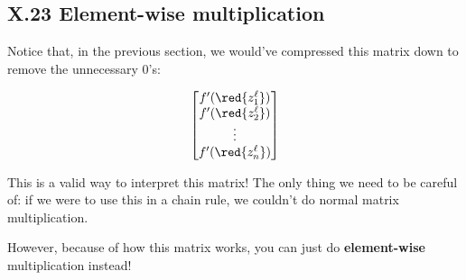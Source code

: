     
    \subsection*{X.23 \quad Element-wise multiplication}

        Notice that, in the previous section, we would've compressed this matrix down to remove the unnecessary 0's:
        
        \begin{equation}
            \begin{bmatrix}
                f'({\red{z_1^\ell}})\\
                f'({\red{z_2^\ell}})\\
                \vdots \\
                f'({\red{z_n^\ell}})
            \end{bmatrix}
        \end{equation}
        
        This is a valid way to interpret this matrix! The only thing we need to be careful of: if we were to use this in a chain rule, we couldn't do normal matrix multiplication.
        
        However, because of how this matrix works, you can just do \textbf{element-wise} multiplication instead!
            
